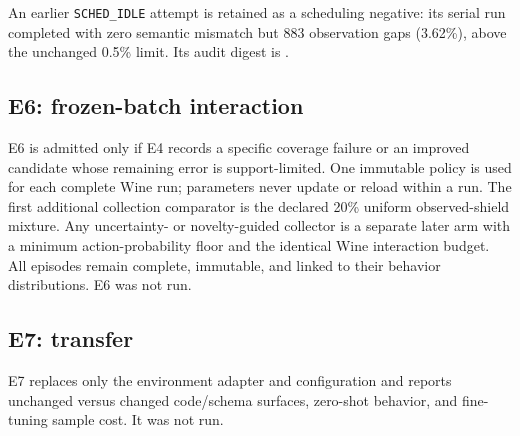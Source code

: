 \documentclass[11pt]{article}
\begin{document}
An earlier \texttt{SCHED\_IDLE} attempt is retained as a scheduling negative:
its serial run completed with zero semantic mismatch but 883 observation gaps
(3.62\%), above the unchanged 0.5\% limit.  Its audit digest is
.

\subsection{E6: frozen-batch interaction}

E6 is admitted only if E4 records a specific coverage failure or an improved
candidate whose remaining error is support-limited.  One immutable policy is
used for each complete Wine run; parameters never update or reload within a
run.  The first additional collection comparator is the declared 20\% uniform
observed-shield mixture.  Any uncertainty- or novelty-guided collector is a
separate later arm with a minimum action-probability floor and the identical
Wine interaction budget.  All episodes remain complete, immutable, and linked
to their behavior distributions.  E6 was not run.

\subsection{E7: transfer}

E7 replaces only the environment adapter and configuration and reports
unchanged versus changed code/schema surfaces, zero-shot behavior, and
fine-tuning sample cost.  It was not run.
\end{document}
